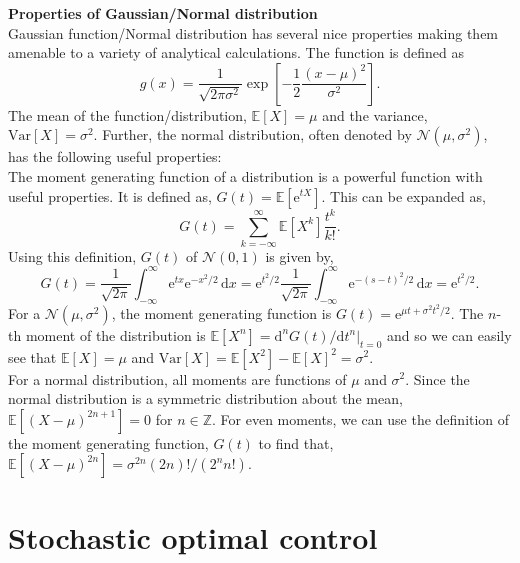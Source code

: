 \documentclass[12pt]{article}
\def\d{\mathrm{d}}
\def\e{\mathrm{e}}
\def\E{\mathbb{E}}
\def\N{\mathcal{N}}
\def\var{\mathrm{Var}}
\def\Z{\mathbb{Z}}
\begin{document}
\begin{singlespace}
\begin{tcolorbox}[colback=gray!20!white,colframe=white,arc=8pt,outer arc=8pt]
    \textbf{\textsf{Properties of Gaussian/Normal distribution}}\\[5pt]
    Gaussian function/Normal distribution has several nice properties making them amenable to a variety of analytical calculations. The function is defined as
    \[
    g(x)={\frac{1}{{\sqrt {2\pi \sigma^2}}}}\exp \left[-{\frac {1}{2}}{\frac {(x-\mu )^{2}}{\sigma ^{2}}}\right].
    \]
    The mean of the function/distribution, $\E[X] = \mu$ and the variance, $\var [X] = \sigma^2$. Further, the normal distribution, often denoted by $\N(\mu, \sigma^2)$, has the following useful properties:\\
    The moment generating function of a distribution is a powerful function with useful properties. It is defined as, $G(t) = \E[\e^{tX}]$. This can be expanded as,
    \[
    G(t) = \sum_{k=-\infty}^{\infty} \E[X^k] \frac{t^k}{k!}.
    \]
    Using this definition, $G(t)$ of $\N(0, 1)$ is given by,
    \[
    G(t) = \frac{1}{\sqrt{2\pi}}\int_{-\infty}^{\infty} \e^{tx} \e^{-x^2/2}\,\d x = \e^{t^2/2} \frac{1}{\sqrt{2\pi}}\int_{-\infty}^{\infty} \e^{-(s-t)^2/2}\,\d x = \e^{t^2/2}.
    \]
    For a $\N(\mu, \sigma^2)$, the moment generating function is $G(t) = \e^{\mu t + \sigma^2t^2/2}$. The $n$-th moment of the distribution is $\E[X^n] = \d^n G(t)/\d t^n |_{t=0}$ and so we can easily see that $\E[X] = \mu$ and $\var[X] = \E[X^2] - \E[X]^2 = \sigma^2$.\\

    For a normal distribution, all moments are functions of $\mu$ and $\sigma^2$. Since the normal distribution is a symmetric distribution about the mean, $\E[(X-\mu)^{2n+1}] = 0$ for $n \in \Z$. For even moments, we can use the definition of the moment generating function, $G(t)$ to find that, $\E[(X-\mu)^{2n}] = \sigma^{2n} (2n)!/(2^n n!)$.
\end{tcolorbox}

\section{Stochastic optimal control}


\end{singlespace}
\end{document}
